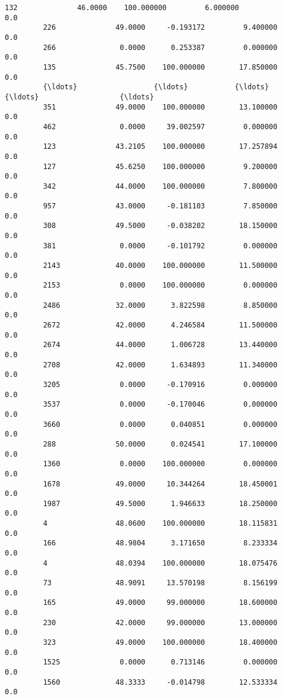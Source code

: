 \documentclass[11pt]{article}
\begin{document}
\begin{Verbatim}[commandchars=\\\{\}]
         132              46.0000    100.000000         6.000000                   0.0   
         226              49.0000     -0.193172         9.400000                   0.0   
         266               0.0000      0.253387         0.000000                   0.0   
         135              45.7500    100.000000        17.850000                   0.0   
         {\ldots}                  {\ldots}           {\ldots}              {\ldots}                   {\ldots}   
         351              49.0000    100.000000        13.100000                   0.0   
         462               0.0000     39.002597         0.000000                   0.0   
         123              43.2105    100.000000        17.257894                   0.0   
         127              45.6250    100.000000         9.200000                   0.0   
         342              44.0000    100.000000         7.800000                   0.0   
         957              43.0000     -0.181103         7.850000                   0.0   
         308              49.5000     -0.038202        18.150000                   0.0   
         381               0.0000     -0.101792         0.000000                   0.0   
         2143             40.0000    100.000000        11.500000                   0.0   
         2153              0.0000    100.000000         0.000000                   0.0   
         2486             32.0000      3.822598         8.850000                   0.0   
         2672             42.0000      4.246584        11.500000                   0.0   
         2674             44.0000      1.006728        13.440000                   0.0   
         2708             42.0000      1.634893        11.340000                   0.0   
         3205              0.0000     -0.170916         0.000000                   0.0   
         3537              0.0000     -0.170046         0.000000                   0.0   
         3660              0.0000      0.040851         0.000000                   0.0   
         288              50.0000      0.024541        17.100000                   0.0   
         1360              0.0000    100.000000         0.000000                   0.0   
         1678             49.0000     10.344264        18.450001                   0.0   
         1987             49.5000      1.946633        18.250000                   0.0   
         4                48.0600    100.000000        18.115831                   0.0   
         166              48.9804      3.171650         8.233334                   0.0   
         4                48.0394    100.000000        18.075476                   0.0   
         73               48.9091     13.570198         8.156199                   0.0   
         165              49.0000     99.000000        18.600000                   0.0   
         230              42.0000     99.000000        13.000000                   0.0   
         323              49.0000    100.000000        18.400000                   0.0   
         1525              0.0000      0.713146         0.000000                   0.0   
         1560             48.3333     -0.014798        12.533334                   0.0   
         

\end{Verbatim}
\end{document}

